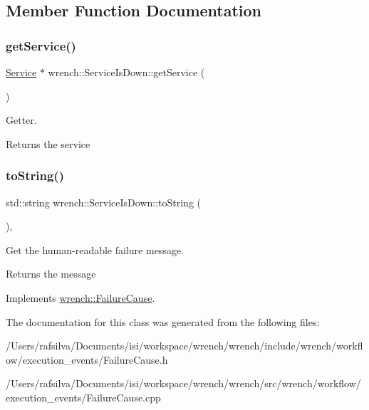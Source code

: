 \subsection{Member Function Documentation}
\mbox{\label{classwrench_1_1_service_is_down_a1e92883f2634958f1af834d791097c90}} 
\subsubsection{\texorpdfstring{get\+Service()}{getService()}}
{\footnotesize\ttfamily \hyperlink{classwrench_1_1_service}{Service} $\ast$ wrench\+::\+Service\+Is\+Down\+::get\+Service (\begin{DoxyParamCaption}{ }\end{DoxyParamCaption})}



Getter. 

\begin{DoxyReturn}{Returns}
the service 
\end{DoxyReturn}
\mbox{\label{classwrench_1_1_service_is_down_a29dbb2d3dd1b5d6a47536bab974b7151}} 
\subsubsection{\texorpdfstring{to\+String()}{toString()}}
{\footnotesize\ttfamily std\+::string wrench\+::\+Service\+Is\+Down\+::to\+String (\begin{DoxyParamCaption}{ }\end{DoxyParamCaption})\hspace{0.3cm}{\ttfamily [override]}, {\ttfamily [virtual]}}



Get the human-\/readable failure message. 

\begin{DoxyReturn}{Returns}
the message 
\end{DoxyReturn}


Implements \hyperlink{classwrench_1_1_failure_cause_afbad248ebe902409f2cd4f1d6f2b867d}{wrench\+::\+Failure\+Cause}.



The documentation for this class was generated from the following files\+:\begin{DoxyCompactItemize}
\item 
/\+Users/rafsilva/\+Documents/isi/workspace/wrench/wrench/include/wrench/workflow/execution\+\_\+events/Failure\+Cause.\+h\item 
/\+Users/rafsilva/\+Documents/isi/workspace/wrench/wrench/src/wrench/workflow/execution\+\_\+events/Failure\+Cause.\+cpp\end{DoxyCompactItemize}

